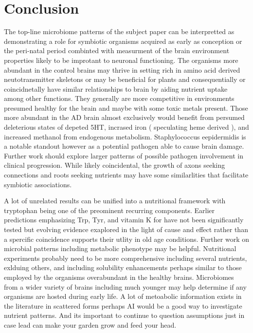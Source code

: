 \documentclass[aps,secnumarabic,balancelastpage,amsmath,amssymb,nofootinbib]{revtex4}
\begin{document}
\section{Conclusion}
The top-line microbiome patterns of the subject paper 
\cite{10.3389/fcimb.2023.1123228} 
can be interpretted as demonstrating a role for symbiotic organisms
acquired as early as conception or the peri-natal period 
combinted with  measurment of  the brain environment properties likely to be
improtant to neuronal functioning. 
The organisms more abundant
in the control brains 
may thrive in setting rich in amino acid derived neutotransmitter
skeletons or 
may be beneficial for plants and consequentially
or coincidnetally have similar relationships to brain 
by aiding nutrient uptake among other functions. They
generally are more competitive in environments presumed
healthy for the brain and maybe with some toxic metals present. 
Those more abundant in the AD brain almost exclusively 
would benefit from persumed deleterious states of 
depeted 5HT, incrased iron ( speculating heme derived ),
and increased methanol from endogenous metabolism. 
Staphylococcus eepidermidis is a notable standout however
as a potential pathogen able to cause brain damage.
Further work should explore larger patterns of possible pathogen
involvement in clinical progression.  
While likely coincidental,  the growth of axons
seeking connections and roots seeking nutrients 
may have some similarlities that facilitate
symbiotic associations. 

A lot of unrelated results can be unified into a nutritional framework
with tryptophan being one of the preominent recurring components.
Earlier predictions emphasizing Trp, Tyr, and vitamin K
for \mjmdisease  have not been significantly tested but 
evolving evidence exaplored in the light of cause and effect
rather than a spercific coincidence supports their utlity
in old age conditions. 
Further work on microbial patterns including
metabolic phenotype may be helpful. Nutritional experiments probably
need to be more comprehensive including several nutrients, exlduing
others, and including solubility enhancements perhaps similar
to those employed by the organisms overabundant in the healthy brains.  
Microbiomes from a wider variety of brains including much younger
may help determine if any organisms are hosted during early life.
A lot of metoabolic information exists in the literature in
scattered forms perhaps AI would be a good way to investigate
nutrient patterns. 
And its important to continue to question assumptions just in 
case lead can make your garden grow and feed your head.
\end{document}
